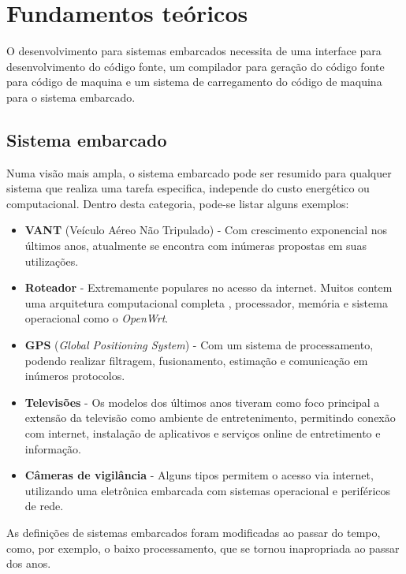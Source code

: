 \chapter{Fundamentos teóricos}

O desenvolvimento para sistemas embarcados necessita de uma interface para desenvolvimento do código fonte, um compilador para geração do código fonte para código de maquina e um sistema de carregamento do código de maquina para o sistema embarcado.

\section{Sistema embarcado}

Numa visão mais ampla, o sistema embarcado pode ser resumido para qualquer sistema que realiza uma tarefa especifica, independe do custo energético ou computacional\cite{barr2006programming}. Dentro desta categoria, pode-se listar alguns exemplos:

\begin{itemize}
\item \textbf{VANT} (Veículo Aéreo Não Tripulado) - Com crescimento exponencial nos últimos anos, atualmente se encontra com inúmeras propostas em suas utilizações.
\item \textbf{Roteador} - Extremamente populares no acesso da internet. Muitos contem uma arquitetura computacional completa , processador, memória e sistema operacional como o \textit{OpenWrt}\cite{openwrt}.
\item \textbf{GPS} (\textit{Global Positioning System}) - Com um sistema de processamento, podendo realizar filtragem, fusionamento, estimação e comunicação em inúmeros protocolos.
\item \textbf{Televisões} - Os modelos dos últimos anos tiveram como foco principal a extensão da televisão como ambiente de entretenimento, permitindo conexão com internet, instalação de aplicativos e serviços online de entretimento e informação.
\item \textbf{Câmeras de vigilância} - Alguns tipos permitem o acesso via internet, utilizando uma eletrônica embarcada com sistemas operacional e periféricos de rede.
\end{itemize}


As definições de sistemas embarcados foram modificadas ao passar do tempo, como, por exemplo, o baixo processamento, que se tornou inapropriada ao passar dos anos\cite{aiimpacts}.


